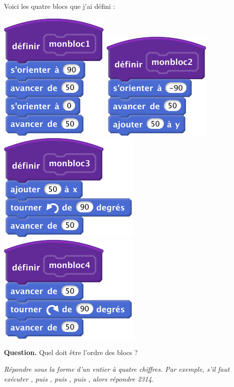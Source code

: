 \documentclass[class=report,crop=false, 12pt]{standalone}
\begin{document}
\begin{enigme}
Voici les quatre blocs que j'ai défini :
\begin{center}
  \includegraphics[scale=\scalebloc,scale=0.8]{bloc-11-eg1b}
  \includegraphics[scale=\scalebloc,scale=0.8]{bloc-11-eg1c}
  \includegraphics[scale=\scalebloc,scale=0.8]{bloc-11-eg1d}
  \includegraphics[scale=\scalebloc,scale=0.8]{bloc-11-eg1e}   
\end{center} 




\bigskip

\textbf{Question.} Quel doit être l'ordre des blocs ?


\emph{Répondre sous la forme d'un entier à quatre chiffres. Par exemple, s'il faut exécuter , puis
, puis , puis , alors répondre 2314.}


\end{enigme}
\end{document}
